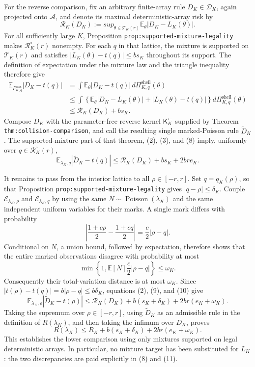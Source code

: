For the reverse comparison, fix an arbitrary finite-array rule \(D_K\in\mathscr D_K\), again projected onto \(\mathcal A\), and denote its maximal deterministic-array risk by
\[
 \mathcal R_K(D_K):=sup_{\theta\in\mathcal T_K(r)}
 \mathbb E_\theta|D_K-L_K(\theta)|.
 \tag{7}
\]
For all sufficiently large \(K\), Proposition \texttt{prop:supported-mixture-legality} makes \(\mathcal R_K^{\circ}(r)\) nonempty.  For each \(q\) in that lattice, the mixture is supported on \(\mathcal T_K(r)\) and satisfies \(|L_K(\theta)-t(q)|\le bs_K\) throughout its support.  The definition of expectation under the mixture law and the triangle inequality therefore give
\[
\begin{aligned}
 \mathbb E_{P^{\mathrm{mix}}_{K,q}}|D_K-t(q)|
 &=\int \mathbb E_\theta|D_K-t(q)|\,
      d\Pi^{\mathrm{shell}}_{K,q}(\theta)\\
 &\le \int\!\left\{
       \mathbb E_\theta|D_K-L_K(\theta)|
       +|L_K(\theta)-t(q)|\right\}
       d\Pi^{\mathrm{shell}}_{K,q}(\theta)\\
 &\le \mathcal R_K(D_K)+bs_K.
\end{aligned}
\tag{8}
\]
Compose \(D_K\) with the parameter-free reverse kernel \(\mathsf K_K^{\leftarrow}\) supplied by Theorem \texttt{thm:collision-comparison}, and call the resulting single marked-Poisson rule \(\widetilde D_K\).  The supported-mixture part of that theorem, (2), (3), and (8) imply, uniformly over \(q\in\mathcal R_K^{\circ}(r)\),
\[
 \mathbb E_{\lambda_K,q}|\widetilde D_K-t(q)|
 \le \mathcal R_K(D_K)+bs_K+2bre_K.
 \tag{9}
\]

It remains to pass from the interior lattice to all \(\rho\in[-r,r]\).  Set \(q=q_K(\rho)\), so that Proposition \texttt{prop:supported-mixture-legality} gives \(|q-\rho|\le\delta_K\).  Couple \(\mathcal E_{\lambda_K,\rho}\) and \(\mathcal E_{\lambda_K,q}\) by using the same \(N\sim\operatorname{Poisson}(\lambda_K)\) and the same independent uniform variables for their marks.  A single mark differs with probability
\[
 \left|\frac{1+c\rho}{2}-\frac{1+cq}{2}\right|
 =\frac c2|\rho-q|.
\]
Conditional on \(N\), a union bound, followed by expectation, therefore shows that the entire marked observations disagree with probability at most
\[
 \min\left\{1,\mathbb E[N]\frac c2|\rho-q|\right\}
 \le \omega_K.
 \tag{10}
\]
Consequently their total-variation distance is at most \(\omega_K\).  Since \(|t(\rho)-t(q)|=b|\rho-q|\le b\delta_K\), equations (2), (9), and (10) give
\[
 \mathbb E_{\lambda_K,\rho}|\widetilde D_K-t(\rho)|
 \le \mathcal R_K(D_K)+b(s_K+\delta_K)
       +2br(e_K+\omega_K).
 \tag{11}
\]
Taking the supremum over \(\rho\in[-r,r]\), using \(\widetilde D_K\) as an admissible rule in the definition of \(R(\lambda_K)\), and then taking the infimum over \(D_K\), proves
\[
 R(\lambda_K)
 \le R_K+b(s_K+\delta_K)+2br(e_K+\omega_K).
 \tag{12}
\]
This establishes the lower comparison using only mixtures supported on legal deterministic arrays.  In particular, no mixture target has been substituted for \(L_K\): the two discrepancies are paid explicitly in (8) and (11).

